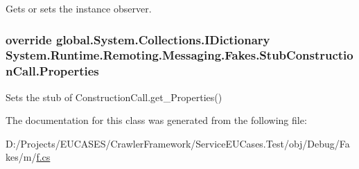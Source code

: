 Gets or sets the instance observer.

\hypertarget{class_system_1_1_runtime_1_1_remoting_1_1_messaging_1_1_fakes_1_1_stub_construction_call_aeedd344569190b87e2cfa1f30e338d5d}{
\subsubsection[{Properties}]{\setlength{\rightskip}{0pt plus 5cm}override global.\-System.\-Collections.\-I\-Dictionary System.\-Runtime.\-Remoting.\-Messaging.\-Fakes.\-Stub\-Construction\-Call.\-Properties\hspace{0.3cm}{\ttfamily [get]}}}\label{class_system_1_1_runtime_1_1_remoting_1_1_messaging_1_1_fakes_1_1_stub_construction_call_aeedd344569190b87e2cfa1f30e338d5d}


Sets the stub of Construction\-Call.\-get\-\_\-\-Properties()



The documentation for this class was generated from the following file\-:\begin{DoxyCompactItemize}
\item 
D\-:/\-Projects/\-E\-U\-C\-A\-S\-E\-S/\-Crawler\-Framework/\-Service\-E\-U\-Cases.\-Test/obj/\-Debug/\-Fakes/m/\hyperlink{m_2f_8cs}{f.\-cs}\end{DoxyCompactItemize}
